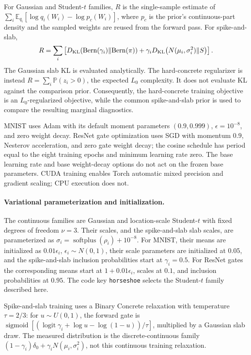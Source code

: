 \documentclass[11pt,a4paper]{article}
\theoremstyle{compactplain}
\theoremstyle{compactdefinition}
\numberwithin{equation}{section}
\begin{document}
For Gaussian and Student-\(t\) families, \(R\) is the single-sample
estimate of \(\sum_i\mathbb E_{q_i}[\log q_i(W_i)-\log p_c(W_i)]\),
where \(p_c\) is the prior's continuous-part density and the sampled
weights are reused from the forward pass. For spike-and-slab,
\[
 R=\sum_i\left[
 D_{\rm KL}\!\left({\rm Bern}(\gamma_i)\|{\rm Bern}(\pi)\right)
 +\gamma_i D_{\rm KL}\!\left(N(\mu_i,\sigma_i^2)\|S\right)
 \right].
\]
The Gaussian slab KL is evaluated analytically. The hard-concrete
regularizer is instead \(R=\sum_i\mathbb P(z_i>0)\), the expected
\(L_0\) complexity. It does not evaluate KL against the comparison
prior. Consequently, the hard-concrete training objective is an
\(L_0\)-regularized objective, while the common spike-and-slab prior is
used to compare the resulting marginal diagnostics.

MNIST uses Adam with its default moment parameters \((0.9,0.999)\),
\(\epsilon=10^{-8}\), and zero weight decay. ResNet gate optimization
uses SGD with momentum \(0.9\), Nesterov acceleration, and zero gate
weight decay; the cosine schedule has period equal to the eight
training epochs and minimum learning rate zero. The base learning rate
and base weight-decay options do not act on the frozen base parameters.
CUDA training enables Torch automatic mixed precision and gradient
scaling; CPU execution does not.

\paragraph{Variational parameterization and initialization.}
The continuous families are Gaussian and location-scale Student-\(t\)
with fixed degrees of freedom \(\nu=3\). Their scales, and the
spike-and-slab slab scales, are parameterized as
\(\sigma_i=\operatorname{softplus}(\rho_i)+10^{-8}\).
For MNIST, their means are initialized as \(0.01\epsilon_i\),
\(\epsilon_i\sim N(0,1)\), their scale parameters are initialized at
\(0.05\), and the spike-and-slab inclusion probabilities start at
\(\gamma_i=0.5\). For ResNet gates the corresponding means start at
\(1+0.01\epsilon_i\), scales at \(0.1\), and inclusion probabilities
at \(0.95\). The code key \texttt{horseshoe} selects the Student-\(t\)
family described here.

Spike-and-slab training uses a Binary Concrete relaxation with
temperature \(\tau=2/3\): for \(u\sim U(0,1)\), the forward gate is
\(\operatorname{sigmoid}[(\operatorname{logit}\gamma_i+
\log u-\log(1-u))/\tau]\), multiplied by a Gaussian slab draw.
The measured distribution is the discrete-continuous family
\((1-\gamma_i)\delta_0+\gamma_i N(\mu_i,\sigma_i^2)\), not this
continuous training relaxation.
\end{document}
